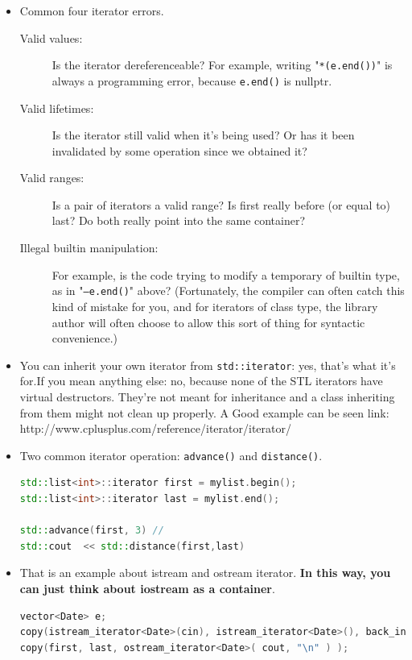 \documentclass[a4paper,11pt,twoside]{book}
\begin{document}
\begin{itemize}
\item Common four iterator errors.
\begin{description}

	\item [Valid values:] Is the iterator dereferenceable? For example, writing "\texttt{*(e.end())}" is always a programming error, because \texttt{e.end()} is nullptr.

	\item [Valid lifetimes:] Is the iterator still valid when it's being used? Or has it been invalidated by some operation since we obtained it?

	\item [Valid ranges:] Is a pair of iterators a valid range? Is first really before (or equal to) last? Do both really point into the same container?

	\item [Illegal builtin manipulation:] For example, is the code trying to modify a temporary of builtin type, as in "\texttt{--e.end()}" above? (Fortunately, the compiler can often catch this kind of mistake for you, and for iterators of class type, the library author will often choose to allow this sort of thing for syntactic convenience.)

\end{description}


	\item You can inherit your own iterator from \texttt{std::iterator}: yes, that's what it's for.If you mean anything else: no, because none of the STL iterators have virtual destructors. They're not meant for inheritance and a class inheriting from them might not clean up properly. A Good example can be seen link: http://www.cplusplus.com/reference/iterator/iterator/

	\item Two common iterator operation:  \texttt{advance()} and \texttt{distance()}.
\begin{lstlisting}[frame=single, language=c++]
std::list<int>::iterator first = mylist.begin();
std::list<int>::iterator last = mylist.end();

std::advance(first, 3) //
std::cout  << std::distance(first,last)
\end{lstlisting}


	\item That is an example about istream and ostream iterator. \textbf{In this way, you can just think about iostream as a container}.
\begin{lstlisting}[frame=single, language=c++]
vector<Date> e;
copy(istream_iterator<Date>(cin), istream_iterator<Date>(), back_inserter(e));
copy(first, last, ostream_iterator<Date>( cout, "\n" ) );
\end{lstlisting}



\end{itemize}
\end{document}
